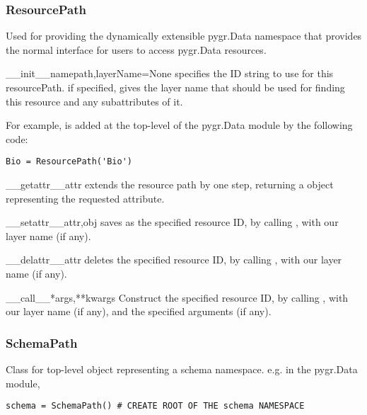 \documentclass{howto}
\begin{document}
\subsubsection{ResourcePath}
Used for providing the dynamically extensible pygr.Data namespace
that provides the normal interface for users to access pygr.Data resources.
\begin{funcdesc}{__init__}{namepath,layerName=None}
   specifies the ID string to use for this resourcePath.
   if specified, gives the layer name that should be used
  for finding this resource and any subattributes of it.

  For example,  is added at the top-level of the pygr.Data module
  by the following code:
\begin{verbatim}
Bio = ResourcePath('Bio')
\end{verbatim}
\end{funcdesc}

\begin{funcdesc}{__getattr__}{attr}
  extends the resource path by one step, returning a
   object representing the requested attribute.
\end{funcdesc}

\begin{funcdesc}{__setattr__}{attr,obj}
  saves  as the specified resource ID, by calling
  , with our layer name (if any).
\end{funcdesc}

\begin{funcdesc}{__delattr__}{attr}
  deletes the specified resource ID, by calling
  , with our layer name (if any).
\end{funcdesc}

\begin{funcdesc}{__call__}{*args,**kwargs}
  Construct the specified resource ID, by calling ,
  with our layer name (if any), and the specified arguments (if any).
\end{funcdesc}

\subsubsection{SchemaPath}
Class for top-level object representing a schema namespace.  e.g. in the pygr.Data
module,
\begin{verbatim}
schema = SchemaPath() # CREATE ROOT OF THE schema NAMESPACE
\end{verbatim}
\end{document}
